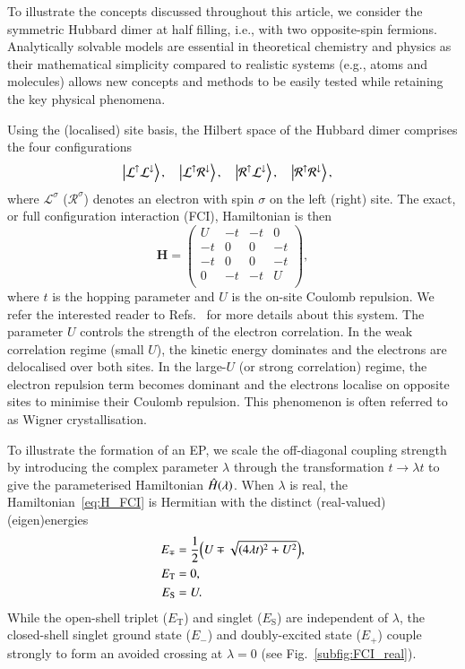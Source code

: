 \documentclass[aps,prb,reprint,noshowkeys,superscriptaddress]{revtex4-1}
\newcommand{\latin}[1]{#1}
\newcommand{\ie}{\latin{i.e.}}
\newcommand{\bH}{\mathbf{H}}
\newcommand{\hH}{\Hat{H}}
\newcommand{\Lup}{\mathcal{L}^{\uparrow}}
\newcommand{\Ldown}{\mathcal{L}^{\downarrow}}
\newcommand{\Lsi}{\mathcal{L}^{\sigma}}
\newcommand{\Rup}{\mathcal{R}^{\uparrow}}
\newcommand{\Rdown}{\mathcal{R}^{\downarrow}}
\newcommand{\Rsi}{\mathcal{R}^{\sigma}}
\begin{document}
To illustrate the concepts discussed throughout this article, we consider the symmetric Hubbard dimer at half filling, \ie, with two opposite-spin fermions.
Analytically solvable models are essential in theoretical chemistry and physics as their mathematical simplicity compared to realistic systems (e.g., atoms and molecules) allows new concepts and methods to be 
easily tested while retaining the key physical phenomena.

Using the (localised) site basis, the Hilbert space of the Hubbard dimer comprises the four configurations
\begin{align*}
& \ket{\Lup \Ldown}, &  & \ket{\Lup\Rdown}, &  & \ket{\Rup\Ldown}, &  & \ket{\Rup\Rdown},
\end{align*}
where $\Lsi$ ($\Rsi$) denotes an electron with spin $\sigma$ on the left (right) site.
The exact, or full configuration interaction (FCI), Hamiltonian is then 
\begin{equation}
\label{eq:H_FCI}
	\bH = 
	\begin{pmatrix}
		U &	- t & -  t & 0	\\
	   -  t &  0 &  0 & -  t \\
       -  t &  0 &  0 & -  t \\
        0 & -  t & -  t & U \\
	\end{pmatrix},
\end{equation}
where $t$ is the hopping parameter and $U$ is the on-site Coulomb repulsion.
We refer the interested reader to Refs.~ for more details about this system.
The parameter $U$ controls the strength of the electron correlation.
In the weak correlation regime (small $U$), the kinetic energy dominates and the electrons are delocalised over both sites.
In the large-$U$ (or strong correlation) regime, the electron repulsion term becomes dominant 
and the electrons localise on opposite sites to minimise their Coulomb repulsion. 
This phenomenon is often referred to as Wigner crystallisation. \cite{Wigner_1934}

To illustrate the formation of an EP, we scale the off-diagonal coupling strength by introducing the complex parameter $\lambda$ through the transformation $t \to \lambda t$ to give the parameterised Hamiltonian $\hH(\lambda)$.
When $\lambda$ is real, the Hamiltonian~\eqref{eq:H_FCI} is Hermitian with the distinct (real-valued) (eigen)energies
\begin{subequations}
\begin{align}
E_{\mp} &= \frac{1}{2} \qty(U \mp \sqrt{ (4 \lambda t)^2 + U^2 } ),
\label{eq:singletE}
\\
E_{\text{T}} &= 0,
\\
E_{\text{S}} &= U.
\end{align}
\end{subequations}
While the open-shell triplet ($E_{\text{T}}$) and singlet ($E_{\text{S}}$) are independent of $\lambda$, the closed-shell singlet ground state ($E_{-}$) and doubly-excited state ($E_{+}$) couple strongly to form an avoided crossing at $\lambda=0$ (see Fig.~\ref{subfig:FCI_real}).
\end{document}
